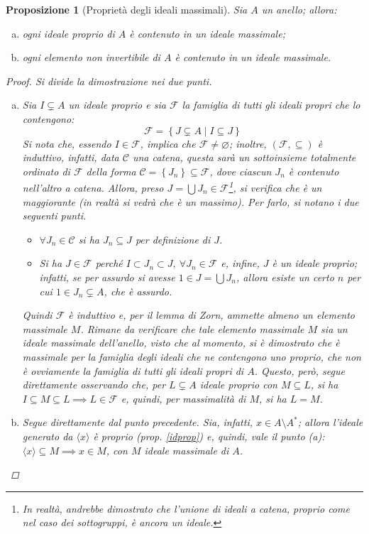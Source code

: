 \documentclass[12pt]{scrartcl}
\theoremstyle{style}
\newtheorem{prop}{Proposizione}[section]
\numberwithin{equation}{subsection}
\begin{document}
\begin{prop}
	[Propriet\`a degli ideali massimali]
	Sia $A$ un anello; allora:
	\begin{enumerate}[(a).]
		\item ogni ideale proprio di $A$ \`e contenuto in un ideale massimale;
		\item ogni elemento non invertibile di $A$ \`e contenuto in un ideale massimale.
	\end{enumerate}
	\begin{proof}
		Si divide la dimostrazione nei due punti.
		\begin{enumerate}[(a).]
			\item Sia $I \subsetneq A$ un ideale proprio e sia $\mathcal{F} $ la famiglia di tutti gli ideali propri che lo contengono:
				\[
				\mathcal{F} =\left\{ J\subsetneq A  \mid I \subseteq J \right\} 
				\] 
				Si nota che, essendo $I \in \mathcal{F} $, implica che $\mathcal{F } \neq \varnothing$; inoltre, $(\mathcal{F} ,\subseteq )$ \`e induttivo, infatti, data $\mathcal{C} $ una catena, questa sar\`a un sottoinsieme totalmente ordinato di $\mathcal{F} $ della forma $\mathcal{C} =\left\{ J_n \right\} \subseteq \mathcal{F} $, dove ciascun $J_n$ \`e contenuto nell'altro a catena.
				Allora, preso $J = \bigcup J_n \in \mathcal{F} $\footnote{In realt\`a, andrebbe dimostrato che l'unione di ideali a catena, proprio come nel caso dei sottogruppi, \`e ancora un ideale.}, si verifica che \`e un maggiorante (in realt\`a si vedr\`a che \`e un massimo).
				Per farlo, si notano i due seguenti punti.
				\begin{itemize}
					\item $\forall J_n \in \mathcal{C} $ si ha $ J_n\subseteq J$ per definizione di $J$.
					\item Si ha $J \in \mathcal{F} $ perch\'e $I \subset J_n \subset J, \ \forall J_n \in \mathcal{F} $ e, infine, $J$ \`e un ideale proprio; infatti, se per assurdo si avesse $1 \in  J = \bigcup J_n$, allora esiste un certo $n$ per cui $1 \in J_n \subsetneq A$, che \`e assurdo.
				\end{itemize}
				Quindi $\mathcal{F} $ \`e induttivo e, per il lemma di Zorn, ammette almeno un elemento massimale $M$.
Rimane da verificare che tale elemento massimale $M$ sia un ideale massimale dell'anello, visto che al momento, si \`e dimostrato che \`e massimale per la famiglia degli ideali che ne contengono uno proprio, che non \`e ovviamente la famiglia di tutti gli ideali propri di $A$.
Questo, per\`o, segue direttamente osservando che, per $L \subsetneq A$ ideale proprio con $M \subseteq L$, si ha $I \subseteq M \subseteq L \implies L \in \mathcal{F} $ e, quindi, per massimalit\`a di $M$, si ha $L = M$.
\item Segue direttamente dal punto precedente.
	Sia, infatti, $x \in A \setminus A^*$; allora l'ideale generato da $\langle x \rangle$ \`e proprio (prop. \ref{idprop}) e, quindi, vale il punto (a): $\langle x \rangle\subseteq M \implies x \in M$, con $M$ ideale massimale di $A$.
		\end{enumerate}
	\end{proof}
\end{prop}
\end{document}
